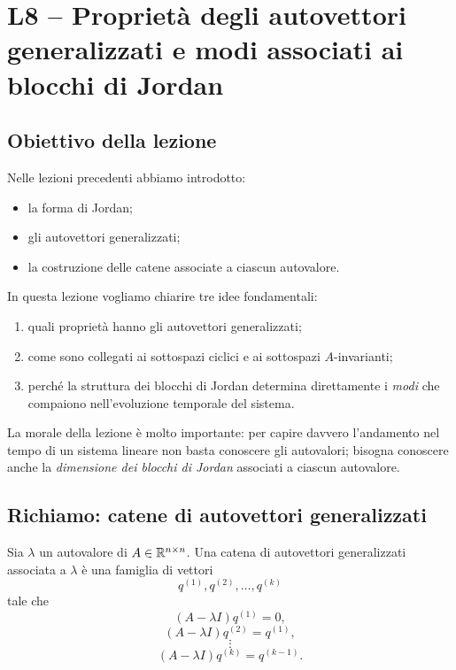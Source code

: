 \chapter{L8 -- Proprietà degli autovettori generalizzati e modi associati ai blocchi di Jordan}

\section{Obiettivo della lezione}

Nelle lezioni precedenti abbiamo introdotto:
\begin{itemize}
    \item la forma di Jordan;
    \item gli autovettori generalizzati;
    \item la costruzione delle catene associate a ciascun autovalore.
\end{itemize}

In questa lezione vogliamo chiarire tre idee fondamentali:

\begin{enumerate}
    \item quali proprietà hanno gli autovettori generalizzati;
    \item come sono collegati ai sottospazi ciclici e ai sottospazi $A$-invarianti;
    \item perché la struttura dei blocchi di Jordan determina direttamente i \emph{modi} che compaiono nell'evoluzione temporale del sistema.
\end{enumerate}

La morale della lezione è molto importante: per capire davvero l'andamento nel tempo di un sistema lineare non basta conoscere gli autovalori; bisogna conoscere anche la \emph{dimensione dei blocchi di Jordan} associati a ciascun autovalore.

\section{Richiamo: catene di autovettori generalizzati}

Sia $\lambda$ un autovalore di $A \in \mathbb{R}^{n\times n}$.  
Una catena di autovettori generalizzati associata a $\lambda$ è una famiglia di vettori
\[
q^{(1)}, q^{(2)}, \dots, q^{(k)}
\]
tale che
\begin{equation}
(A-\lambda I)q^{(1)} = 0,
\label{eq:L8_chain_1}
\end{equation}
\begin{equation}
(A-\lambda I)q^{(2)} = q^{(1)},
\label{eq:L8_chain_2}
\end{equation}
\[
\vdots
\]
\begin{equation}
(A-\lambda I)q^{(k)} = q^{(k-1)}.
\label{eq:L8_chain_k}
\end{equation}


